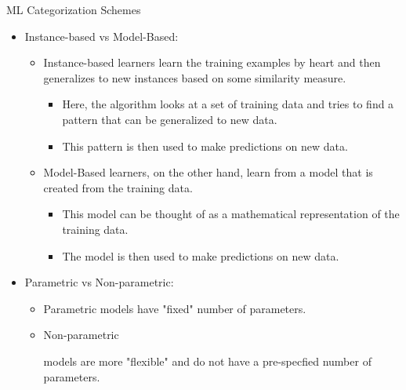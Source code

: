 \documentclass[compress,oilve]{beamer}
\newcommand{\tc}[2]{
	\textcolor{#1}{\hspace{-2pt}#2\hspace{-2pt}}
}
\begin{document}
\begin{frame}{ML Categorization Schemes}
	\begin{itemize}
		\item Instance-based vs Model-Based:
		\begin{itemize}
			\item \tc{keywords}{Instance-based} learners learn the training examples by heart and then generalizes to new instances based on some similarity measure.
			
			\begin{itemize}
				\item Here, the algorithm looks at a set of training data and tries to find a pattern that can be generalized to new data.
				
				\item This pattern is then used to make predictions on new data.
			\end{itemize}
			
			\item \tc{keywords}{Model-Based} learners, on the other hand, learn from a model that is created from the training data.
			
			\begin{itemize}
				\item This model can be thought of as a mathematical representation of the training data.
				\item The model is then used to make predictions on new data.
			\end{itemize}
		\end{itemize}
		
		\medskip
		\item Parametric vs Non-parametric:
		
		\begin{itemize}
			\item \tc{keywords}{Parametric} models have "fixed" number of parameters.
			
			\item \tc{keywords}{Non-parametric}
			models are more "flexible" and do not have a pre-specfied number of parameters.
			
		\end{itemize}
		
		\medskip
	\end{itemize}
\end{frame}


\end{document}
